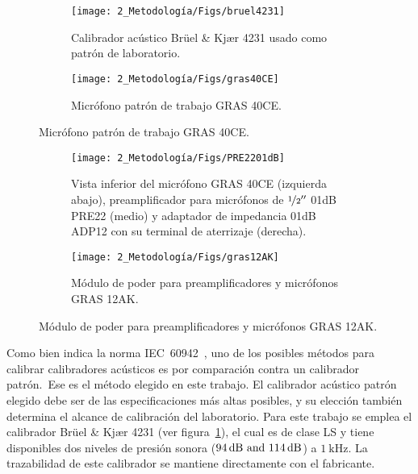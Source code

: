 \begin{figure}[!h]
    \caption{Patrones acústicos para la calibración de calibradores acústicos.}
    \centering
    \begin{subfigure}[t]{0.49\textwidth}
        \centering
        \texttt{[image: 2\_Metodología/Figs/bruel4231]}
        \caption{Calibrador acústico Brüel \& Kjær 4231 usado como patrón de laboratorio.}
        \label{fig:bruel_4231}
    \end{subfigure}
    \hfill
    \begin{subfigure}[t]{0.49\textwidth}
        \centering
        \texttt{[image: 2\_Metodología/Figs/gras40CE]}
        \caption{Micrófono patrón de trabajo GRAS 40CE.}
        \label{fig:gras_40CE}
    \end{subfigure}
\end{figure}
%
\begin{figure}[!h]
    \caption{Instrumentos para adecuación de la señal eléctrica.}
    \centering
    \begin{subfigure}[t]{0.6\textwidth}
        \centering
        \texttt{[image: 2\_Metodología/Figs/PRE2201dB]}
        \caption{Vista inferior del micrófono GRAS 40CE (izquierda abajo),
            preamplificador para micrófonos de $\nicefrac{1}{2}''$ 01dB PRE22 (medio)
            y adaptador de impedancia 01dB ADP12 con su terminal de aterrizaje (derecha).}
        \label{fig:PRE22_01dB}
    \end{subfigure}
    \hfill
    \begin{subfigure}[t]{0.38\textwidth}
        \centering
        \texttt{[image: 2\_Metodología/Figs/gras12AK]}
        \caption{Módulo de poder para preamplificadores y micrófonos GRAS 12AK.}
        \label{fig:gras_12AK}
    \end{subfigure}
\end{figure}

Como bien indica la norma \mbox{IEC 60942}~\citeyearpar{IEC_TC29_2017}, uno de los posibles métodos para calibrar calibradores acústicos es por comparación contra un calibrador patrón.\ Ese es el método elegido en este trabajo.
El calibrador acústico patrón elegido debe ser de las especificaciones más altas posibles, y su elección también determina el alcance de calibración del laboratorio.
Para este trabajo se emplea el calibrador Brüel \& Kjær 4231 (ver figura~\ref{fig:bruel_4231}), el cual es de clase LS y tiene disponibles dos niveles de presión sonora ($\qtylist{94;114}{\dB}$) a $\qty{1}{\kHz}$.
La trazabilidad de este calibrador se mantiene directamente con el fabricante.

